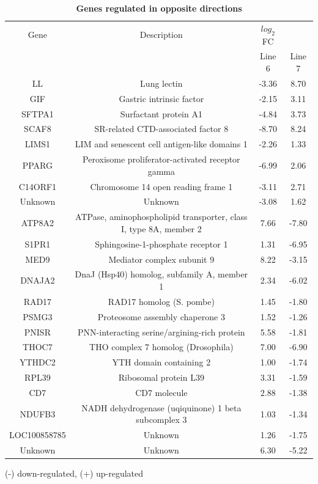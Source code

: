\documentclass[10pt]{article}
\begin{document}
\begin{table}[!ht]
\caption{
\bf{Genes regulated in opposite directions}}
    \begin{tabular}{cccc}
        \hline
        Gene & Description & $log_{2}$FC & \\
         & & Line 6 & Line 7 \\
        \hline
        LL & Lung lectin & -3.36 & 8.70 \\
        GIF & Gastric intrinsic factor & -2.15 & 3.11 \\
        SFTPA1 & Surfactant protein A1 & -4.84 & 3.73 \\
        SCAF8 & SR-related CTD-associated factor 8 & -8.70 & 8.24 \\
        LIMS1 & LIM and senescent cell antigen-like domains 1 & -2.26 & 1.33 \\
        PPARG & Peroxisome proliferator-activated receptor gamma & -6.99 & 2.06 \\
        C14ORF1 & Chromosome 14 open reading frame 1 & -3.11 & 2.71 \\
        Unknown & Unknown & -3.08 & 1.62 \\
        \hline
        ATP8A2 & ATPase, aminophospholipid transporter, class I, type 8A, member 2 & 7.66 & -7.80 \\
        S1PR1 & Sphingosine-1-phosphate receptor 1 & 1.31 & -6.95 \\
        MED9 & Mediator complex subunit 9 & 8.22 & -3.15 \\
        DNAJA2 & DnaJ (Hsp40) homolog, subfamily A, member 1 & 2.34 & -6.02 \\
        RAD17 & RAD17 homolog (S. pombe) & 1.45 & -1.80 \\
        PSMG3 & Proteosome assembly chaperone 3 & 1.52 & -1.26 \\
        PNISR & PNN-interacting serine/argining-rich protein & 5.58 & -1.81 \\
        THOC7 & THO complex 7 homolog (Drosophila) & 7.00 & -6.90 \\
        YTHDC2 & YTH domain containing 2 & 1.00 & -1.74 \\
        RPL39 & Ribosomal protein L39 & 3.31 & -1.59 \\
        CD7 & CD7 molecule & 2.88 & -1.38 \\
        NDUFB3 & NADH dehydrogenase (uqiquinone) 1 beta subcomplex 3 & 1.03 & -1.34 \\
        LOC100858785 & Unknown & 1.26 & -1.75 \\
        Unknown & Unknown & 6.30 & -5.22 \\
        \hline
    \end{tabular}
    \begin{flushleft}
        (-) down-regulated, (+) up-regulated
    \end{flushleft}
    \label{tab:opposite}
\end{table}
\end{document}
